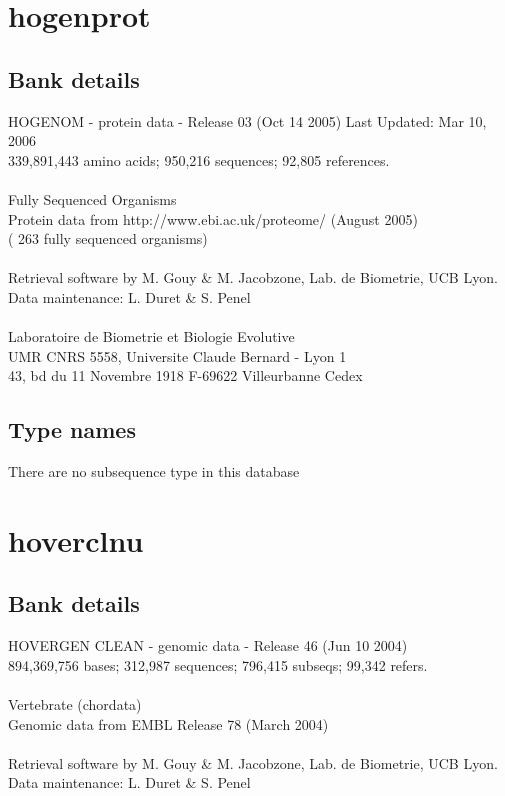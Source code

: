\documentclass{article}
\begin{document}
\begin{Schunk}
\section{ hogenprot }
\subsection{Bank details}
HOGENOM - protein data - Release 03 (Oct 14 2005) Last Updated: Mar 10, 2006\\
339,891,443 amino acids; 950,216 sequences; 92,805 references.\\
\\
Fully Sequenced Organisms\\
Protein data from http://www.ebi.ac.uk/proteome/ (August 2005)\\
( 263 fully sequenced organisms)\\
\\
Retrieval software by M. Gouy \& M. Jacobzone, Lab. de Biometrie, UCB Lyon.\\
Data maintenance: L. Duret \& S. Penel\\
\\
Laboratoire de Biometrie et Biologie Evolutive\\
UMR CNRS 5558, Universite Claude Bernard - Lyon 1\\
43, bd du 11 Novembre 1918 F-69622 Villeurbanne Cedex\\


\subsection{Type names}
There are no subsequence type in this database
\section{ hoverclnu }
\subsection{Bank details}
HOVERGEN CLEAN - genomic data - Release 46 (Jun 10 2004)\\
894,369,756 bases; 312,987 sequences; 796,415 subseqs; 99,342 refers.\\
\\
Vertebrate (chordata)\\
Genomic data from EMBL Release 78  (March 2004)\\
\\
Retrieval software by M. Gouy \& M. Jacobzone, Lab. de Biometrie, UCB Lyon.\\
Data maintenance: L. Duret \& S. Penel\\



\end{Schunk}
\end{document}
